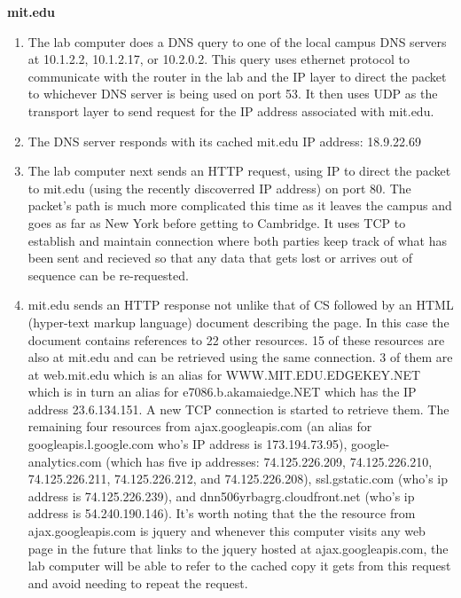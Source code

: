 \documentclass[11pt]{article}
\begin{document}
  \textbf{mit.edu}
\begin{enumerate}
\item The lab computer does a DNS query to one of the local campus DNS
     servers at 10.1.2.2, 10.1.2.17, or 10.2.0.2.  This query uses
     ethernet protocol to communicate with the router in the lab and
     the IP layer to direct the packet to whichever DNS server is
     being used on port 53.  It then uses UDP as the transport layer
     to send request for the IP address associated with mit.edu.
\item The DNS server responds with its cached mit.edu IP address:
     18.9.22.69
\item The lab computer next sends an HTTP request, using IP to direct
     the packet to mit.edu (using the recently discoverred IP address) on
     port 80.  The packet's path is much more complicated this time as
     it leaves the campus and goes as far as New York before getting
     to Cambridge.  It uses TCP to establish and maintain connection
     where both parties keep track of what has been sent and recieved
     so that any data that gets lost or arrives out of sequence can be
     re-requested.
\item mit.edu sends an HTTP response not unlike that of CS followed by
     an HTML (hyper-text markup language) document describing the
     page.  In this case the document contains references to 22 other
     resources.  15 of these resources are also at mit.edu and can be
     retrieved using the same connection.  3 of them are at
     web.mit.edu which is an alias for WWW.MIT.EDU.EDGEKEY.NET which
     is in turn an alias for e7086.b.akamaiedge.NET which has the IP
     address 23.6.134.151.  A new TCP connection is started to
     retrieve them.  The remaining four resources from
     ajax.googleapis.com (an alias for googleapis.l.google.com who's
     IP address is 173.194.73.95), google-analytics.com (which has
     five ip addresses: 74.125.226.209, 74.125.226.210,
     74.125.226.211, 74.125.226.212, and 74.125.226.208),
     ssl.gstatic.com (who's ip address is 74.125.226.239), and
     dnn506yrbagrg.cloudfront.net (who's ip address is
     54.240.190.146).  It's worth noting that the the resource from
     ajax.googleapis.com is jquery and whenever this computer visits
     any web page in the future that links to the jquery hosted at
     ajax.googleapis.com, the lab computer will be able to refer to
     the cached copy it gets from this request and avoid needing to
     repeat the request.
\end{enumerate}
  
\end{document}
